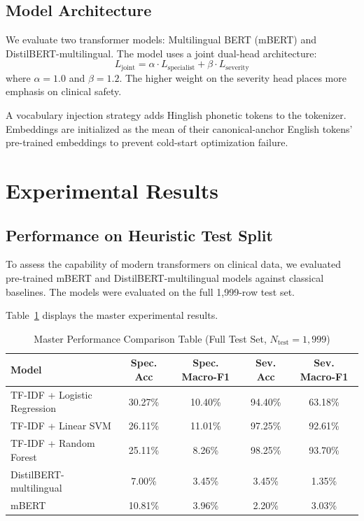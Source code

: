 \documentclass[10pt,conference]{IEEEtran}
\begin{document}
\subsection{Model Architecture}
We evaluate two transformer models: Multilingual BERT (mBERT) and DistilBERT-multilingual. The model uses a joint dual-head architecture:
\begin{equation}
L_{\text{joint}} = \alpha \cdot L_{\text{specialist}} + \beta \cdot L_{\text{severity}}
\end{equation}
where $\alpha = 1.0$ and $\beta = 1.2$. The higher weight on the severity head places more emphasis on clinical safety. 

A vocabulary injection strategy adds Hinglish phonetic tokens to the tokenizer. Embeddings are initialized as the mean of their canonical-anchor English tokens' pre-trained embeddings to prevent cold-start optimization failure.

\section{Experimental Results}

\subsection{Performance on Heuristic Test Split}
To assess the capability of modern transformers on clinical data, we evaluated pre-trained mBERT and DistilBERT-multilingual models against classical baselines. The models were evaluated on the full 1,999-row test set.

Table~\ref{tab:master_results} displays the master experimental results.

\begin{table}[t]
\centering
\caption{Master Performance Comparison Table (Full Test Set, $N_{\text{test}} = 1,999$)}
\label{tab:master_results}
\begin{tabular}{l c c c c}
\toprule
\textbf{Model} & \textbf{Spec. Acc} & \textbf{Spec. Macro-F1} & \textbf{Sev. Acc} & \textbf{Sev. Macro-F1} \\
\midrule
TF-IDF + Logistic Regression & 30.27\% & 10.40\% & 94.40\% & 63.18\% \\
TF-IDF + Linear SVM & 26.11\% & 11.01\% & 97.25\% & 92.61\% \\
TF-IDF + Random Forest & 25.11\% & 8.26\% & 98.25\% & 93.70\% \\
\midrule
DistilBERT-multilingual & 7.00\% & 3.45\% & 3.45\% & 1.35\% \\
mBERT & 10.81\% & 3.96\% & 2.20\% & 3.03\% \\
\bottomrule
\end{tabular}
\end{table}
\end{document}
